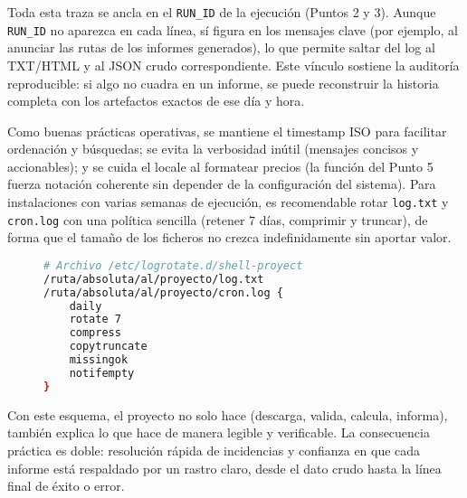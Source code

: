 Toda esta traza se ancla en el \texttt{RUN\_ID} de la ejecución (Puntos 2 y 3). Aunque \texttt{RUN\_ID} no aparezca en cada línea, sí figura en los mensajes clave (por ejemplo, al anunciar las rutas de los informes generados), lo que permite saltar del log al TXT/HTML y al JSON crudo correspondiente. Este vínculo sostiene la auditoría reproducible: si algo no cuadra en un informe, se puede reconstruir la historia completa con los artefactos exactos de ese día y hora.

Como buenas prácticas operativas, se mantiene el timestamp ISO para facilitar ordenación y búsquedas; se evita la verbosidad inútil (mensajes concisos y accionables); y se cuida el locale al formatear precios (la función del Punto 5 fuerza notación coherente sin depender de la configuración del sistema). Para instalaciones con varias semanas de ejecución, es recomendable rotar \texttt{log.txt} y \texttt{cron.log} con una política sencilla (retener 7 días, comprimir y truncar), de forma que el tamaño de los ficheros no crezca indefinidamente sin aportar valor.

\begin{figure}[H]
  \begin{lstlisting}[language=bash, caption={Figura 6.6 — Propuesta de logrotate (opcional)}]
# Archivo /etc/logrotate.d/shell-proyect
/ruta/absoluta/al/proyecto/log.txt
/ruta/absoluta/al/proyecto/cron.log {
    daily
    rotate 7
    compress
    copytruncate
    missingok
    notifempty
}
\end{lstlisting}
\end{figure}

Con este esquema, el proyecto no solo hace (descarga, valida, calcula, informa), también explica lo que hace de manera legible y verificable. La consecuencia práctica es doble: resolución rápida de incidencias y confianza en que cada informe está respaldado por un rastro claro, desde el dato crudo hasta la línea final de éxito o error.
